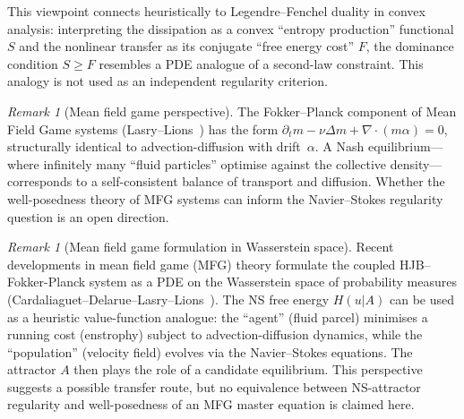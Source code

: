 \documentclass[12pt,a4paper]{article}
\theoremstyle{definition}
\theoremstyle{plain}
\theoremstyle{remark}
\newtheorem{remark}[definition]{Remark}
\begin{document}
This viewpoint connects heuristically to Legendre--Fenchel duality in convex analysis: interpreting the dissipation as a convex ``entropy production'' functional $S$ and the nonlinear transfer as its conjugate ``free energy cost'' $F$, the dominance condition $S \ge F$ resembles a PDE analogue of a second-law constraint. This analogy is not used as an independent regularity criterion.

\begin{remark}[Mean field game perspective]
The Fokker--Planck component of Mean Field Game systems
(Lasry--Lions~\cite{LasryLions2007}) has the form
$\partial_t m - \nu\Delta m + \nabla\cdot(m\alpha) = 0$,
structurally identical to advection-diffusion with drift~$\alpha$.
A Nash equilibrium---where infinitely many ``fluid particles'' optimise
against the collective density---corresponds to a self-consistent
balance of transport and diffusion.  Whether the well-posedness theory
of MFG systems can inform the Navier--Stokes regularity question is an
open direction.
\end{remark}

\begin{remark}[Mean field game formulation in Wasserstein space]
\label{rem:mfg-wasserstein}
Recent developments in mean field game (MFG) theory formulate the coupled HJB--Fokker-Planck system as a PDE on the Wasserstein space of probability measures (Cardaliaguet--Delarue--Lasry--Lions~\cite{CDLL2019}). The NS free energy $H(u|A)$ can be used as a heuristic value-function analogue: the ``agent'' (fluid parcel) minimises a running cost (enstrophy) subject to advection-diffusion dynamics, while the ``population'' (velocity field) evolves via the Navier--Stokes equations. The attractor $A$ then plays the role of a candidate equilibrium. This perspective suggests a possible transfer route, but no equivalence between NS-attractor regularity and well-posedness of an MFG master equation is claimed here.
\end{remark}
\end{document}

